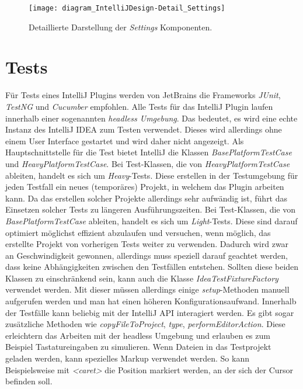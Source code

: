 \begin{figure}
    \centering
    \texttt{[image: diagram\_IntelliJDesign-Detail\_Settings]}
    \caption{Detaillierte Darstellung der \emph{Settings} Komponenten.}
    \label{fig:diagram_IntelliJDesign-Detail_Settings}
\end{figure}

\section{Tests}
\label{sec:EntwicklungIntelliJ_Tests}

Für Tests eines IntelliJ Plugins werden von JetBrains 
die Frameworks \emph{JUnit}, \emph{TestNG} und \emph{Cucumber} empfohlen. 
Alle Tests für das IntelliJ Plugin laufen innerhalb einer sogenannten
\emph{headless Umgebung}. Das bedeutet, es wird eine echte Instanz
des IntelliJ IDEA zum Testen verwendet. Dieses wird allerdings ohne einem
User Interface gestartet und wird daher nicht angezeigt.
Als Hauptschnittstelle für die Test bietet IntelliJ die Klassen
\emph{BasePlatformTestCase} und \emph{HeavyPlatformTestCase}.
Bei Test-Klassen, die von \emph{HeavyPlatformTestCase} ableiten,
handelt es sich um \emph{Heavy}-Tests. Diese erstellen in
der Testumgebung für jeden Testfall ein neues (temporäres)
Projekt, in welchem das Plugin arbeiten kann. Da das erstellen solcher
Projekte allerdings sehr aufwändig ist, führt das Einsetzen solcher
Tests zu längeren Ausführungszeiten.
Bei Test-Klassen, die von \emph{BasePlatformTestCase} ableiten,
handelt es sich um \emph{Light}-Tests. Diese sind darauf optimiert
möglichst effizient abzulaufen und versuchen, wenn möglich, das 
erstellte Projekt von vorherigen Tests weiter zu verwenden.
Dadurch wird zwar an Geschwindigkeit gewonnen, allerdings
muss speziell darauf geachtet werden, dass keine Abhängigkeiten zwischen
den Testfällen entstehen.
Sollten diese beiden Klassen zu einschränkend sein, kann auch die
Klasse \emph{IdeaTestFixtureFactory} verwendet werden. Mit dieser
müssen allerdings einige \emph{setup}-Methoden manuell aufgerufen
werden und man hat einen höheren Konfigurationsaufwand.
Innerhalb der Testfälle kann beliebig mit der IntelliJ API interagiert
werden. Es gibt sogar zusätzliche Methoden wie \emph{copyFileToProject},
\emph{type}, \emph{performEditorAction}. Diese erleichtern
das Arbeiten mit der headless Umgebung und erlauben es zum Beispiel
Tastatureingaben zu simulieren.
Wenn Dateien in das Testprojekt geladen werden, kann spezielles Markup
verwendet werden. So kann Beispielsweise mit \emph{<caret>} die Position
markiert werden, an der sich der Cursor befinden soll.

